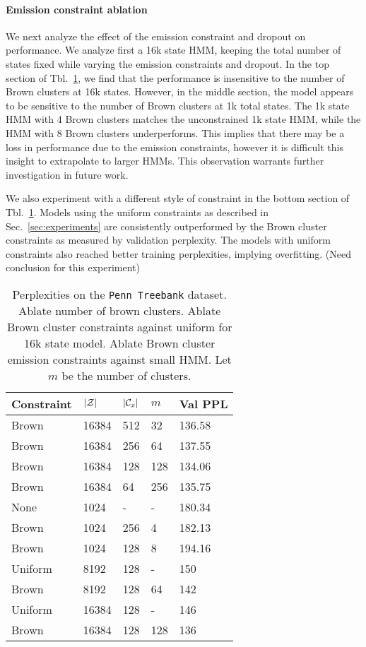 \documentclass[11pt,a4paper]{article}
\begin{document}
\paragraph{Emission constraint ablation}
We next analyze the effect of the emission constraint and dropout on performance.
We analyze first a 16k state HMM, keeping the total number of states fixed
while varying the emission constraints and dropout.
In the top section of Tbl.~\ref{tbl:constraint-ablation},
we find that the performance is
insensitive to the number of Brown clusters at 16k states.
However, in the middle section,
the model appears to be sensitive to the number of Brown clusters
at 1k total states. 
The 1k state HMM with 4 Brown clusters matches the unconstrained 1k state HMM,
while the HMM with 8 Brown clusters underperforms.
This implies that there may be a loss in performance due to the emission
constraints, however it is difficult this insight
to extrapolate to larger HMMs.
This observation warrants further investigation in future work.

We also experiment with a different style of constraint in the
bottom section of Tbl.~\ref{tbl:constraint-ablation}.
Models using the uniform constraints as described in Sec.~\ref{sec:experiments}
are consistently outperformed by the Brown cluster constraints
as measured by validation perplexity.
The models with uniform constraints also reached better training perplexities,
implying overfitting.
(Need conclusion for this experiment)

\begin{table}[!t]
\centering
\begin{tabular}{lllll}
\toprule
Constraint & $|\mathcal{Z}|$ & $|\mathcal{C}_x|$ & $m$ & Val PPL\\
\midrule
Brown & 16384 & 512 & 32  & 136.58\\
Brown & 16384 & 256 & 64  & 137.55\\
Brown & 16384 & 128 & 128 & 134.06\\
Brown & 16384 & 64  & 256 & 135.75\\
\midrule
None  & 1024 & - & - & 180.34\\
Brown & 1024 & 256 & 4 & 182.13\\
Brown & 1024 & 128 & 8 & 194.16\\
\midrule
Uniform    & 8192    & 128    & -   & 150\\
Brown      & 8192    & 128    & 64  & 142\\
Uniform    & 16384   & 128    & -   & 146\\
Brown      & 16384   & 128    & 128 & 136\\
\bottomrule
\end{tabular}
\caption{\label{tbl:constraint-ablation}
Perplexities on the \texttt{Penn Treebank} dataset.
Ablate number of brown clusters.
Ablate Brown cluster constraints against uniform for 16k state model.
Ablate Brown cluster emission constraints against small HMM.
Let $m$ be the number of clusters.
}
\end{table}
\end{document}
